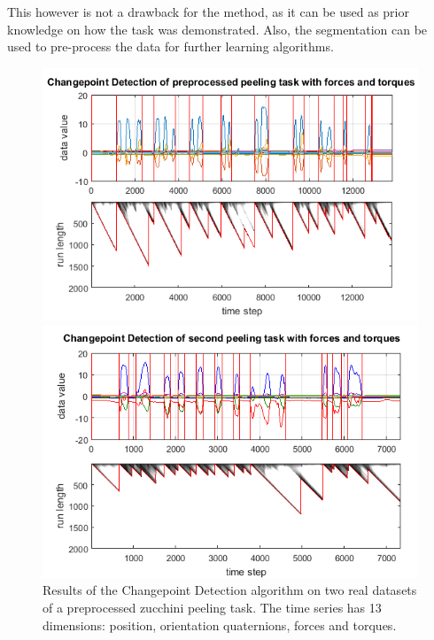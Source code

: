 \documentclass[11pt,twoside,a4paper]{report}
\begin{document}
This however is not a drawback for the method, as it can be used as prior knowledge on how the task was demonstrated. Also, the segmentation can be used to pre-process the data for further learning algorithms.

\begin{figure} [ht]
\begin{minipage}{\textwidth}
\centering
\includegraphics[width=.7\textwidth]{proc1.png}
\end{minipage}
\begin{minipage}{\textwidth}
\centering
\includegraphics[width=.7\textwidth]{proc2.png}
\end{minipage}
\caption{Results of the Changepoint Detection algorithm on two real datasets of a preprocessed zucchini peeling task. The time series has 13 dimensions: position, orientation quaternions, forces and torques.}
\label{fig:peelAll}
\end{figure}
\end{document}
